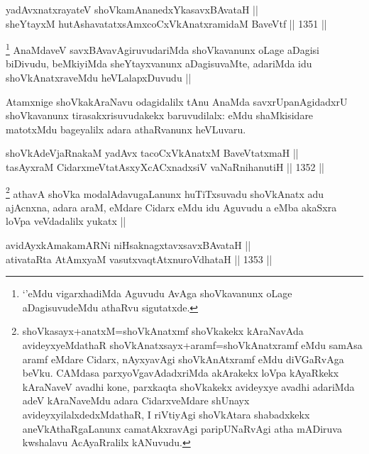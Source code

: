 
\begin{shl}
yadAvx\s natxrayateV shoVkamAnanedxYkasavxBAvataH || \\
sheYtayxM hutAshavatatxsAmxcoCxVkAnatxramidaM BaveVtf ||  1351 ||  
\end{shl}

\begin{artha}
\footnote{`\stext'eMdu vigarxhadiMda Aguvudu AvAga shoVkavanunx oLage aDagisuvudeMdu athaRvu sigutatxde.}
AnaMdaveV savxBAvavAgiruvudariMda shoVkavanunx oLage aDagisi biDivudu, beMkiyiMda sheYtayxvanunx aDagisuvaMte, adariMda idu shoVkAnatxraveMdu heVLalapxDuvudu ||
\end{artha}

\begin{artha}
Atamxnige shoVkakAraNavu odagidalilx tAnu AnaMda savxrUpanAgidadxrU shoVkavanunx tirasakxrisuvudakekx baruvudilalx: eMdu shaMkisidare matotxMdu bageyalilx adara athaRvanunx heVLuvaru.
\end{artha}

\begin{shl}
shoVkAdeVjaRnakaM yadAvx tacoCxVkAnatxM BaveVtatxmaH || \\
tasAyxraM CidarxmeVtatAsxyXcACxnadxsiV vaNaRnihanutiH ||  1352 ||  
\end{shl}

\begin{artha}
\footnote{shoVkasayx+anatxM=shoVkAnatxmf shoVkakekx kAraNavAda avideyxyeMdathaR shoVkAnatxsayx+aramf=shoVkAnatxramf eMdu samAsa aramf eMdare Cidarx, nAyxyavAgi shoVkAnAtxramf eMdu diVGaRvAga beVku. CAMdasa parxyoVgavAdadxriMda akArakekx loVpa kAyaRkekx kAraNaveV avadhi kone, parxkaqta shoVkakekx avideyxye avadhi adariMda adeV kAraNaveMdu adara CidarxveMdare shUnayx avideyxyilalxdedxMdathaR, I riVtiyAgi shoVkAtara shabadxkekx aneVkAthaRgaLanunx camatAkxravAgi paripUNaRvAgi atha mADiruva kwshalavu AcAyaRralilx kANuvudu.}
athavA shoVka modalAdavugaLanunx huTiTxsuvadu shoVkAnatx adu ajAcnxna, adara araM, eMdare Cidarx eMdu idu Aguvudu a eMba akaSxra loVpa veVdadalilx yukatx ||
\end{artha}


\begin{shl}
avidAyxkAmakamARNi niHsaknagxtavxsavxBAvataH || \\
ativataRta AtAmx\s yaM vasutxvaqtAtxnuroVdhataH ||  1353 ||  
\end{shl}

